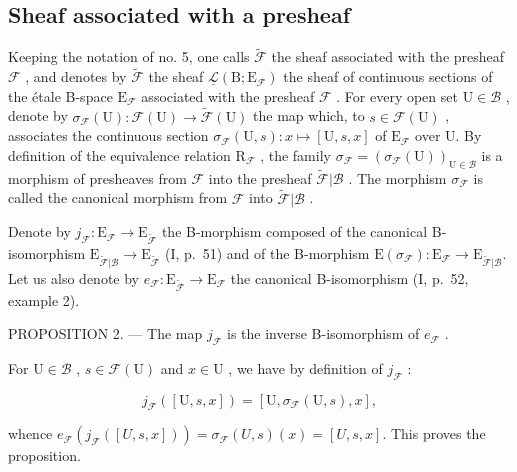 \subsection{Sheaf associated with a presheaf}

Keeping the notation of no. 5, one calls \(\widetilde{\mathcal{F}}\) the sheaf associated with the presheaf \(\mathcal{F}\) , and denotes by \(\widetilde{\mathcal{F}}\) the sheaf \(\underline{\mathcal{L}}(\mathrm{B};\mathrm{E}_{\mathcal{F}})\) the sheaf of continuous sections of the étale B-space \(\mathrm{E}_{\mathcal{F}}\) associated with the presheaf \(\mathcal{F}\) . For every open set \(\mathrm{U}\in\mathcal{B}\) , denote by \(\sigma_{\mathcal{F}}(\mathrm{U})\colon\mathcal{F}(\mathrm{U})\to\widetilde{\mathcal{F}}(\mathrm{U})\) the map which, to \(s\in\mathcal{F}(\mathrm{U})\) , associates the continuous section \(\sigma_{\mathcal{F}}(\mathrm{U},s)\colon x\mapsto[\mathrm{U},s,x]\) of \(\mathrm{E}_{\mathcal{F}}\) over U. By definition of the equivalence relation \(\mathrm{R}_{\mathcal{F}}\) , the family \(\sigma_{\mathcal{F}}=(\sigma_{\mathcal{F}}(\mathrm{U}))_{\mathrm{U}\in\mathcal{B}}\) is a morphism of presheaves from \(\mathcal{F}\) into the presheaf \(\widetilde{\mathcal{F}}|\mathcal{B}\) . The morphism \(\sigma_{\mathcal{F}}\) is called the canonical morphism from \(\mathcal{F}\) into \(\widetilde{\mathcal{F}}|\mathcal{B}\) .

Denote by \(j_{\mathcal{F}} \colon \mathrm{E}_{\mathcal{F}} \to \mathrm{E}_{\widetilde{\mathcal{F}}}\) the B-morphism composed of the canonical B-isomorphism \(\mathrm{E}_{\widetilde{\mathcal{F}}|\mathcal{B}} \to \mathrm{E}_{\widetilde{\mathcal{F}}}\) (I, p.~51) and of the B-morphism \(\mathrm{E}(\sigma_{\mathcal{F}}) \colon \mathrm{E}_{\mathcal{F}} \to \mathrm{E}_{\widetilde{\mathcal{F}}|\mathcal{B}}\). Let us also denote by \(e_{\mathcal{F}} \colon \mathrm{E}_{\widetilde{\mathcal{F}}} \to \mathrm{E}_{\mathcal{F}}\) the canonical B-isomorphism (I, p.~52, example 2).

PROPOSITION 2. --- The map \(j_{\mathcal{F}}\) is the inverse B-isomorphism of \(e_{\mathcal{F}}\) .

For \(\mathrm{U}\in \mathcal{B}\) , \(s\in \mathcal{F}(\mathrm{U})\) and \(x\in \mathrm{U}\) , we have by definition of \(j_{\mathcal{F}}\) :

\[
j _ {\mathcal {F}} ([ \mathrm{U}, s, x ]) = [ \mathrm{U}, \sigma_ {\mathcal {F}} (\mathrm{U}, s), x ],
\]

whence \(e_{\mathcal{F}}(j_{\mathcal{F}}([U,s,x])) = \sigma_{\mathcal{F}}(U,s)(x) = [U,s,x]\). This proves the proposition.

